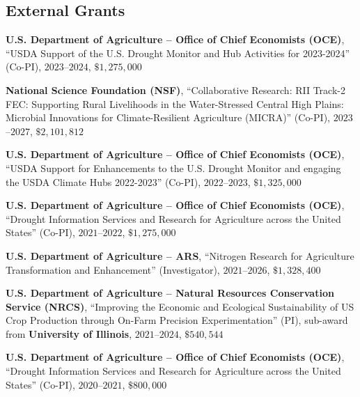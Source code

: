 \documentclass[10pt,margin,line]{res}
\newenvironment{list1}{
  \begin{list}{\ding{113}}{%
      \setlength{\itemsep}{0in}
      \setlength{\parsep}{0in} \setlength{\parskip}{0in}
      \setlength{\topsep}{0in} \setlength{\partopsep}{0in}
      \setlength{\leftmargin}{0.17in}}}{\end{list}}
\begin{document}
\begin{resume}

\section{\sc External Grants}
\begin{list1}
\item[] \textbf{U.S. Department of Agriculture -- Office of Chief Economists (OCE)}, ``USDA Support of the U.S. Drought Monitor and Hub Activities for 2023-2024'' (Co-PI), $2023$--$2024$, $\$1,275,000$
\vspace*{.05in}
\item[] \textbf{National Science Foundation (NSF)}, ``Collaborative Research: RII Track-2 FEC: Supporting Rural Livelihoods in the Water-Stressed Central High Plains: Microbial Innovations for Climate-Resilient Agriculture (MICRA)'' (Co-PI), $2023$--$2027$, $\$2,101,812$
\vspace*{.05in}
\item[] \textbf{U.S. Department of Agriculture -- Office of Chief Economists (OCE)}, ``USDA Support for Enhancements to the U.S. Drought Monitor and engaging the USDA Climate Hubs 2022-2023'' (Co-PI), $2022$--$2023$, $\$1,325,000$
\vspace*{.05in}
\item[] \textbf{U.S. Department of Agriculture -- Office of Chief Economists (OCE)}, ``Drought Information Services and Research for Agriculture across the United States'' (Co-PI), $2021$--$2022$, $\$1,275,000$
\vspace*{.05in}
\item[] \textbf{U.S. Department of Agriculture -- ARS}, ``Nitrogen Research for Agriculture Transformation and Enhancement'' (Investigator), $2021$--$2026$, $\$1,328,400$
\vspace*{.05in}
\item[] \textbf{U.S. Department of Agriculture -- Natural Resources Conservation Service (NRCS)}, ``Improving the Economic and Ecological Sustainability of US Crop Production through On-Farm Precision Experimentation'' (PI), sub-award from \textbf{University of Illinois}, $2021$--$2024$, $\$540,544$
\vspace*{.05in}
\item[] \textbf{U.S. Department of Agriculture -- Office of Chief Economists (OCE)}, ``Drought Information Services and Research for Agriculture across the United States'' (Co-PI), $2020$--$2021$, $\$800,000$

\end{list1}
\end{resume}
\end{document}
